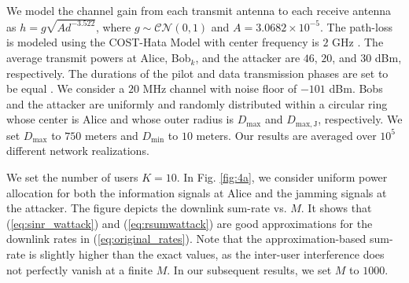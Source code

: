 \documentclass[draftclsnofoot, 12pt, onecolumn, journal]{IEEEtran}
\begin{document}
We model the channel gain from each transmit antenna to each receive antenna as $h = g \sqrt{A d^{-3.522}}$, where $g \sim \mathcal{C} \mathcal{N} (0,1)$ and $A = 3.0682 \times 10^{-5}$.
The path-loss is modeled using the COST-Hata Model with center frequency is $2$ GHz \cite{abhayawardhana2005comparison}.
The average transmit powers at Alice, Bob$_k$, and the attacker are $46$, $20$, and $30$ dBm, respectively.
The durations of the pilot and data transmission phases are set to be equal \cite{Marzetta2010}.
We consider a $20$ MHz channel with noise floor of $-101$ dBm. 
Bobs and the attacker are uniformly and randomly distributed within a circular ring whose center is Alice and whose outer radius is $D_{\mathrm{max}}$ and $D_{\mathrm{max,J}}$, respectively.
We set $D_{\mathrm{max}}$ to $750$ meters and $D_{\mathrm{min}}$ to $10$ meters.
Our results are averaged over $10^5$ different network realizations. 

We set the number of users $K = 10$.
In Fig. \ref{fig:4a}, we consider uniform power allocation for both the information signals at Alice and the jamming signals at the attacker.
The figure depicts the downlink sum-rate vs. $M$.
It shows that (\ref{eq:sinr_wattack}) and (\ref{eq:rsumwattack}) are good approximations for the downlink rates in (\ref{eq:original_rates}).
Note that the approximation-based sum-rate is slightly higher than the exact values, as the inter-user interference does not perfectly vanish at a finite $M$.
In our subsequent results, we set $M$ to $1000$. 
\end{document}
